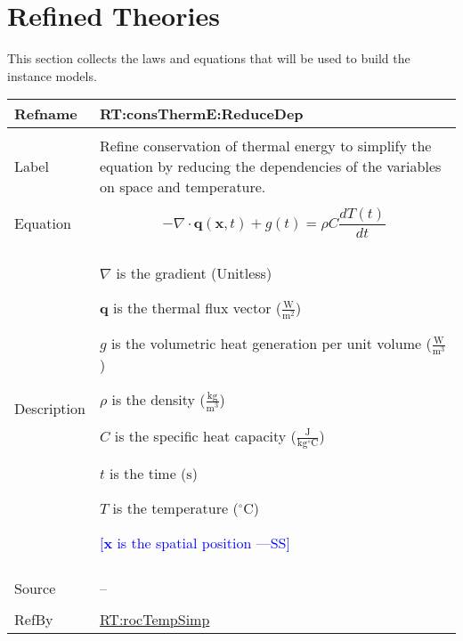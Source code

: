 \documentclass[12pt]{article}
\newcommand{\authornote}[3]{\textcolor{#1}{[#3 ---#2]}}
\newcommand{\authornote}[3]{}
\newcommand{\wss}[1]{\authornote{blue}{SS}{#1}}
\begin{document}

\section{Refined Theories} \label{Sec:RefndTheories}

This section collects the laws and equations that will be used to build the instance models.


\vspace{\baselineskip}
\noindent
\begin{minipage}{\textwidth}
\begin{tabular}{>{\raggedright}p{}>{\raggedright\arraybackslash}p{}}
\toprule \textbf{Refname} & \textbf{RT:consThermE:ReduceDep}
\label{RT:consThermE:ReduceDep}
\\ \midrule \\
Label & Refine conservation of thermal energy to simplify the equation by reducing the dependencies of the variables on space and temperature.
        
\\ \midrule \\
Equation & \begin{displaymath}
        -{\nabla \cdot \mathbf{q} (\mathbf{x}, t)} + g(t) = \rho C \frac{dT(t)}{dt}
        \end{displaymath}
\\ \midrule \\
Description & \begin{symbDescription}
        \item{$∇$ is the gradient (Unitless)}
        \item{$\symbf{q}$ is the thermal flux vector ($\frac{\text{W}}{\text{m}^{2}}$)}
        \item{$g$ is the volumetric heat generation per unit volume ($\frac{\text{W}}{\text{m}^{3}}$)}
        \item{$ρ$ is the density ($\frac{\text{kg}}{\text{m}^{3}}$)}
        \item{$C$ is the specific heat capacity ($\frac{\text{J}}{\text{kg}{}^{\circ}\text{C}}$)}
        \item{$t$ is the time (${\text{s}}$)}
        \item{$T$ is the temperature (${{}^{\circ}\text{C}}$)}
        \item \wss{$\mathbf{x}$ is the spatial position}
        \end{symbDescription}
\\ \midrule \\
Source & -- 
\\ \midrule \\
         
RefBy & \hyperref[RT:rocTempSimp]{RT:rocTempSimp}

\\ \bottomrule
\end{tabular}
\end{minipage}
\end{document}
